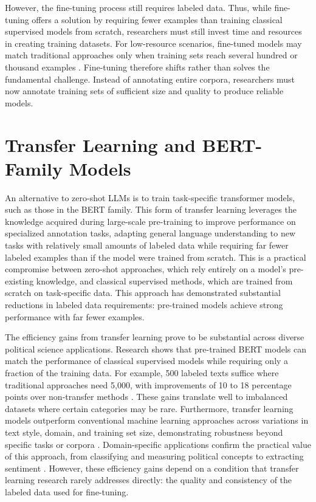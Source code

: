 \documentclass[12pt]{article}
\begin{document}
However, the fine-tuning process still requires labeled data. Thus, while fine-tuning offers a solution by requiring fewer examples than training classical supervised models from scratch, researchers must still invest time and resources in creating training datasets. For low-resource scenarios, fine-tuned models may match traditional approaches only when training sets reach several hundred or thousand examples \parencite{wang_etal24}. Fine-tuning therefore shifts rather than solves the fundamental challenge. Instead of annotating entire corpora, researchers must now annotate training sets of sufficient size and quality to produce reliable models.

\section{Transfer Learning and BERT-Family Models}

An alternative to zero-shot LLMs is to train task-specific transformer models, such as those in the BERT family. This form of transfer learning leverages the knowledge acquired during large-scale pre-training to improve performance on specialized annotation tasks,  adapting general language understanding to new tasks with relatively small amounts of labeled data while requiring far fewer labeled examples than if the model were trained from scratch. This is a practical compromise between zero-shot approaches, which rely entirely on a model’s pre-existing knowledge, and classical supervised methods, which are trained from scratch on task-specific data. This approach has demonstrated substantial reductions in labeled data requirements: pre-trained models achieve strong performance with far fewer examples\parencite{laurer_etal23, wankmuller24}.

The efficiency gains from transfer learning prove to be substantial across diverse political science applications. Research shows that pre-trained BERT models can match the performance of classical supervised models while requiring only a fraction of the training data. For example, 500 labeled texts suffice where traditional approaches need 5,000, with improvements of 10 to 18 percentage points over non-transfer methods \parencite{laurer_etal23}. These gains translate well to imbalanced datasets where certain categories may be rare. Furthermore, transfer learning models outperform conventional machine learning approaches across variations in text style, domain, and training set size, demonstrating robustness beyond specific tasks or corpora \parencite{wankmuller24}. Domain-specific applications confirm the practical value of this approach, from classifying and measuring political concepts to extracting sentiment \parencite{dreier_etal25, matsuo_fukumoto25, bonikowskiPoliticsUsualMeasuring2022}. However, these efficiency gains depend on a condition that transfer learning research rarely addresses directly: the quality and consistency of the labeled data used for fine-tuning.
\end{document}
